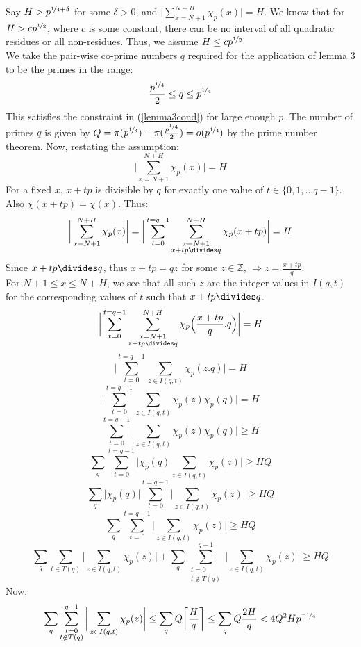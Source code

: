 \documentclass{article}
\begin{document}
Say $H>p^{\nicefrac{1}{4}+\delta}$ for some $\delta>0$, and $\Big \lvert \sum\limits_{x=N+1}^{N+H}\chi_p(x)\Big \rvert=H$. We know that for $H>cp^{\nicefrac{1}{2}}$, where $c$ is some constant, there can be no interval of all quadratic residues or all non-residues. Thus, we assume $H\leq cp^{\nicefrac{1}{2}}$\\
We take the pair-wise co-prime numbers $q$ required for the application of lemma 3 to be the primes in the range:
$$\frac{p^{\nicefrac{1}{4}}}{2} \leq q \leq p^{\nicefrac{1}{4}}$$
This satisfies the constraint in (\ref{lemma3cond}) for large enough $p$. The number of primes $q$ is given by $Q=\pi(p^{\nicefrac{1}{4}})-\pi(\frac{p^{\nicefrac{1}{4}}}{2})=o(p^{\nicefrac{1}{4}})$ by the prime number theorem. Now, restating the assumption:
$$\bigg \lvert\sum\limits_{x=N+1}^{N+H}\chi_p(x)\bigg \rvert=H$$
For a fixed $x$, $x+tp$ is divisible by $q$ for exactly one value of $t\in\{0,1,...q-1\}$. Also $\chi(x+tp)=\chi(x)$. Thus:
$$\bigg \lvert\sum\limits_{x=N+1}^{N+H}\chi_p(x)\bigg \rvert=\bigg \lvert\sum\limits_{t=0}^{t=q-1}\sum\limits_{\substack{x=N+1\\x+tp\divides q}}^{N+H}\chi_p(x+tp)\bigg \rvert=H$$
Since $x+tp\divides q$, thus $x+tp=qz$ for some $z\in\mathbb{Z}$, $\Rightarrow z=\frac{x+tp}{q}$.\\
For $N+1\leq x \leq N+H$, we see that all such $z$ are the integer values in $I(q,t)$ for the corresponding values of $t$ such that $x+tp\divides q$.
$$\bigg \lvert\sum\limits_{t=0}^{t=q-1}\sum\limits_{\substack{x=N+1\\x+tp\divides q}}^{N+H} \chi_p \Big(\frac{x+tp}{q}.q\Big)\bigg \rvert=H$$
$$\bigg \lvert\sum\limits_{t=0}^{t=q-1}\sum\limits_{z\in I(q,t)}\chi_p(z.q)\bigg \rvert=H$$
$$\bigg \lvert\sum\limits_{t=0}^{t=q-1}\sum\limits_{z\in I(q,t)}\chi_p(z)\chi_p(q)\bigg \rvert=H$$
$$\sum\limits_{t=0}^{t=q-1}\bigg \lvert\sum\limits_{z\in I(q,t)}\chi_p(z)\chi_p(q)\bigg \rvert \geq H$$
$$\sum_q\sum\limits_{t=0}^{t=q-1}\bigg \lvert\chi_p(q)\sum\limits_{z\in I(q,t)}\chi_p(z)\bigg \rvert \geq HQ$$
$$\sum_q\bigg \lvert\chi_p(q)\bigg\rvert\sum\limits_{t=0}^{t=q-1}\bigg\lvert\sum\limits_{z\in I(q,t)}\chi_p(z)\bigg \rvert \geq HQ$$
$$\sum_q\sum\limits_{t=0}^{t=q-1}\bigg \lvert\sum\limits_{z\in I(q,t)}\chi_p(z)\bigg \rvert \geq HQ$$
$$\sum_q\sum\limits_{t\in T(q)}\bigg \lvert\sum\limits_{z\in I(q,t)}\chi_p(z)\bigg \rvert+\sum_q\sum\limits_{\substack{t=0\\t\not \in T(q)}}^{q-1}\bigg \lvert\sum\limits_{z\in I(q,t)}\chi_p(z)\bigg \rvert \geq HQ$$
Now,
$$\sum_q\sum\limits_{\substack{t=0\\t\not \in T(q)}}^{q-1}\bigg\lvert\sum\limits_{z\in I(q,t) }\chi_p(z)\bigg \rvert \leq \sum\limits_q Q\bigg\lceil\frac{H}{q}\bigg\rceil \leq \sum\limits_q Q\frac{2H}{q} < 4Q^2 Hp^{\nicefrac{-1}{4}}$$
\end{document}
